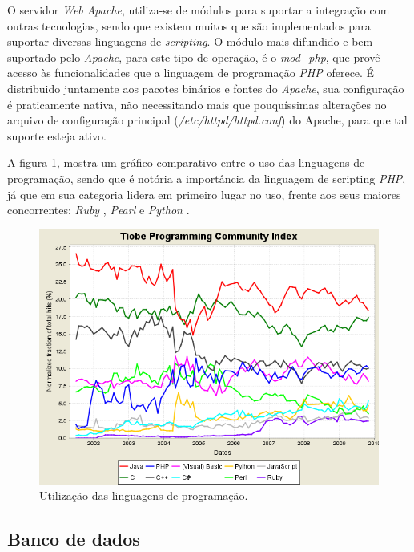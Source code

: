 O servidor \textit{Web} \textit{Apache}, utiliza-se de módulos para suportar a integração com outras tecnologias, sendo que existem muitos que são implementados para suportar diversas linguagens de \textit{scripting}. O módulo mais difundido e bem suportado pelo \textit{Apache}, para este tipo de operação, é o \textit{mod\_php}, que provê acesso às funcionalidades que a linguagem de programação \textit{PHP} oferece. É distribuido juntamente aos pacotes binários e fontes do \textit{Apache}, sua configuração é praticamente nativa, não necessitando mais que pouquíssimas alterações no arquivo de configuração principal (\textit{/etc/httpd/httpd.conf}) do Apache, para que tal suporte esteja ativo.

A figura \ref{figura:linguagens_programacao}, mostra um gráfico comparativo entre o uso das linguagens de programação, sendo que é notória a importância da linguagem de scripting \textit{PHP}, já que em sua categoria lidera em primeiro lugar no uso, frente aos seus maiores concorrentes: \textit{Ruby} \cite{Ruby}, \textit{Pearl} \cite{Pearl} e \textit{Python} \cite{Python}.

\clearpage
\begin{figure}[h!tp]
    \begin{center}
        \includegraphics[scale=0.7]{./figuras/tpci_trends.png}

        \caption{\label{figura:linguagens_programacao}Utilização das linguagens de programação. \cite{Languages}}
    \end{center}
\end{figure}

\subsection{Banco de dados}

